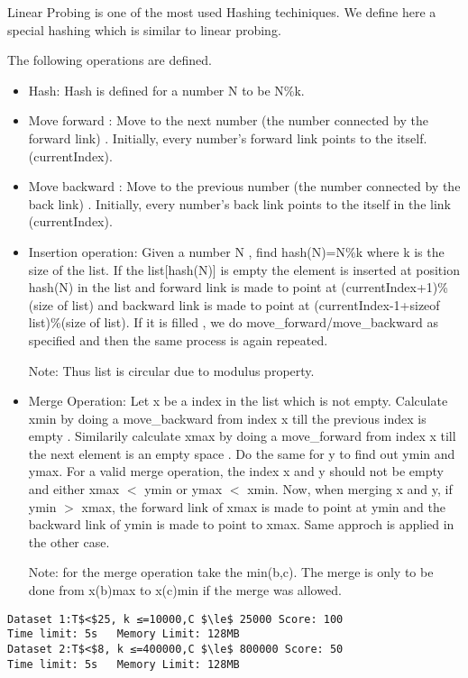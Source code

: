 Linear Probing is one of the most used Hashing techiniques. We define here a special hashing which is similar to linear probing.  

   The following operations are defined.  
\begin{itemize}
	\item     Hash: Hash is defined for a number N to be N\%k.   
	\item     Move forward : Move to the next number (the number connected by the forward link) . Initially, every number's forward link points to the itself. (currentIndex).   
	\item     Move backward : Move to the previous number (the number connected by the back link) . Initially, every number's back link points to the itself in the link (currentIndex).   
	\item     Insertion operation: Given a number N , find hash(N)=N\%k where k is the size of the list. If the list[hash(N)] is empty the element is inserted at position hash(N) in the list and forward link is made to point at (currentIndex+1)\%(size of list) and backward link is made to point at (currentIndex-1+sizeof list)\%(size of list). If it is filled , we do move\_forward/move\_backward as specified and then the same process is again repeated.   

    Note: Thus list is circular due to modulus property.   
	\item     Merge Operation: Let x be a index in the list which is not empty. Calculate xmin by doing a move\_backward from index x till the previous index is empty . Similarily calculate xmax by doing a move\_forward from index x till the next element is an empty space . Do the same for y to find out ymin and ymax. For a valid merge operation, the index x and y should not be empty and either xmax $<$ ymin or ymax $<$ xmin. Now, when merging x and y, if ymin $>$ xmax, the forward link of xmax is made to point at ymin and the backward link of ymin is made to point to xmax. Same approch is applied in the other case.   

    Note: for the merge operation take the min(b,c). The merge is only to be done from x(b)max to x(c)min if the merge was allowed.   
\end{itemize}
\begin{verbatim}
Dataset 1:T$<$25, k ≤=10000,C $\le$ 25000 Score: 100
Time limit: 5s   Memory Limit: 128MB
Dataset 2:T$<$8, k ≤=400000,C $\le$ 800000 Score: 50
Time limit: 5s   Memory Limit: 128MB 
\end{verbatim}